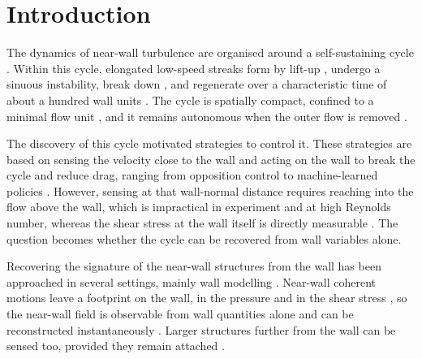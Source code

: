 \documentclass[pdflatex,sn-basic]{sn-jnl}
\theoremstyle{thmstyleone}%
\theoremstyle{thmstyletwo}%
\theoremstyle{thmstylethree}%
\begin{document}

\maketitle

\section{Introduction}\label{sec:intro}
The dynamics of near-wall turbulence are organised around a self-sustaining
cycle \citep{Waleffe_1997}. Within this cycle, elongated low-speed streaks form
by lift-up \citep{brandt2014liftup}, undergo a sinuous instability, break down
\citep{andersson2001breakdown}, and regenerate over a characteristic time of
about a hundred wall units \citep{Hamilton_Kim_Waleffe_1995}. The cycle is
spatially compact, confined to a minimal flow unit \citep{jimenez1991minimal},
and it remains autonomous when the outer flow is removed
\citep{jimenez1999autonomous}.

The discovery of this cycle motivated strategies to control it. These strategies
are based on sensing the velocity close to the wall and acting on the wall to
break the cycle and reduce drag, ranging from opposition control
\citep{choi1994active} to machine-learned policies
\citep{guastoni2023drl,cavallazzi2025drl}. However, sensing at that wall-normal
distance requires reaching into the flow above the wall, which is impractical in
experiment and at high Reynolds number, whereas the shear stress at the wall
itself is directly measurable \citep{naughton2002modern,lofdahl1999mems}. The
question becomes whether the cycle can be recovered from wall variables alone.

Recovering the signature of the near-wall structures from the wall has been
approached in several settings, mainly wall modelling
\citep{piomelli2002walllayer,bose2018wallmodeled}. Near-wall coherent motions
\citep{robinson1991coherent} leave a footprint on the wall, in the pressure
\citep{naguib2001stochastic} and in the shear stress
\citep{kravchenko1993relation}, so the near-wall field is observable from wall
quantities alone and can be reconstructed instantaneously
\citep{guemes2021coarse,cuellar2024threedimensional}. Larger structures further
from the wall can be sensed too, provided they remain attached
\citep{encinar2019logarithmic}.
\end{document}
